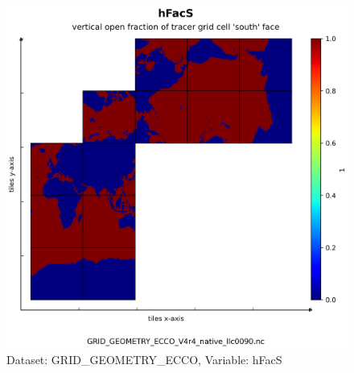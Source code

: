 \begin{figure}[H]
\centering
\includegraphics[scale=0.55]{../images/plots/native_plots_coords/Geometry_Parameters_for_the_Lat-Lon-Cap_90_(llc90)_Native_Model_Grid_(Version_4_Release_4)/hFacS.png}
\caption{Dataset: GRID\_GEOMETRY\_ECCO, Variable: hFacS}
\label{tab:table-GRID_GEOMETRY_ECCO_hFacS-Plot}
\end{figure}
\pagebreak

